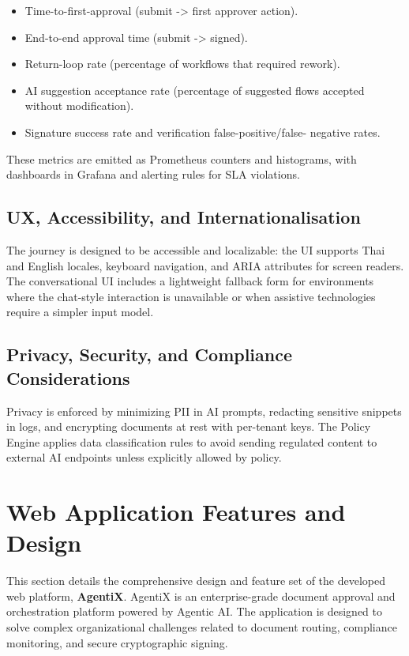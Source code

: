 \documentclass[12pt,oneside,openright,a4paper]{cpe-english-project}
\begin{document}
\begin{itemize}
  \item Time-to-first-approval (submit -> first approver action).
  \item End-to-end approval time (submit -> signed).
  \item Return-loop rate (percentage of workflows that required
    rework).
  \item AI suggestion acceptance rate (percentage of suggested flows
    accepted without modification).
  \item Signature success rate and verification false-positive/false-
    negative rates.
\end{itemize}

These metrics are emitted as Prometheus counters and histograms, with
dashboards in Grafana and alerting rules for SLA violations.

\subsection{UX, Accessibility, and Internationalisation}

The journey is designed to be accessible and localizable: the UI
supports Thai and English locales, keyboard navigation, and ARIA
attributes for screen readers. The conversational UI includes a
lightweight fallback form for environments where the chat-style
interaction is unavailable or when assistive technologies require a
simpler input model.

\subsection{Privacy, Security, and Compliance Considerations}

Privacy is enforced by minimizing PII in AI prompts, redacting sensitive
snippets in logs, and encrypting documents at rest with per-tenant
keys. The Policy Engine applies data classification rules to avoid
sending regulated content to external AI endpoints unless explicitly
allowed by policy.

\section{Web Application Features and Design}

This section details the comprehensive design and feature set of the developed web platform, \textbf{AgentiX}. AgentiX is an enterprise-grade document approval and orchestration platform powered by Agentic AI. The application is designed to solve complex organizational challenges related to document routing, compliance monitoring, and secure cryptographic signing.
\end{document}

